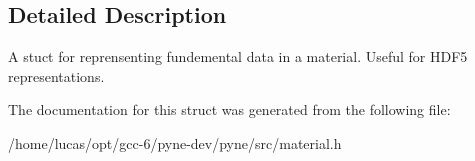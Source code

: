 \subsection{Detailed Description}
A stuct for reprensenting fundemental data in a material. Useful for H\+D\+F5 representations. 

The documentation for this struct was generated from the following file\+:\begin{DoxyCompactItemize}
\item 
/home/lucas/opt/gcc-\/6/pyne-\/dev/pyne/src/material.\+h\end{DoxyCompactItemize}
